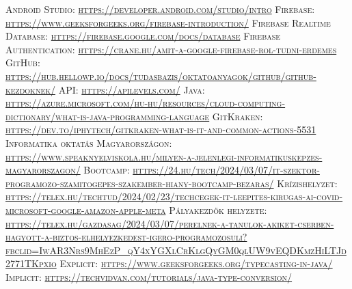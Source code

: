 \documentclass{thesis-ekf}
\begin{document}
	\begin{thebibliography}{14}
		\setlength{\itemindent}{0em}
		 \textsc{Android Studio: \url{https://developer.android.com/studio/intro}}
		 \textsc{Firebase: \url{https://www.geeksforgeeks.org/firebase-introduction/}}
		 \textsc{Firebase Realtime Database: \url{https://firebase.google.com/docs/database}}
		 \textsc{Firebase Authentication: \url{https://crane.hu/amit-a-google-firebase-rol-tudni-erdemes}}
		 \textsc{GitHub: \url{https://hub.hellowp.io/docs/tudasbazis/oktatoanyagok/github/github-kezdoknek/}}
		 \textsc{API: \url{https://apilevels.com/}}
		 \textsc{Java: \url{https://azure.microsoft.com/hu-hu/resources/cloud-computing-dictionary/what-is-java-programming-language}}
		 \textsc{GitKraken: \url{https://dev.to/iphytech/gitkraken-what-is-it-and-common-actions-5531}}
		 \textsc{Informatika oktatás Magyarországon: \url{https://www.speaknyelviskola.hu/milyen-a-jelenlegi-informatikuskepzes-magyarorszagon/}}
		 \textsc{Bootcamp: \url{https://24.hu/tech/2024/03/07/it-szektor-programozo-szamitogepes-szakember-hiany-bootcamp-bezaras/}}
		 \textsc{Krízishelyzet: \url{https://telex.hu/techtud/2024/02/23/techcegek-it-leepites-kirugas-ai-covid-microsoft-google-amazon-apple-meta}}
		 \textsc{Pályakezdők helyzete: \url{https://telex.hu/gazdasag/2024/03/07/perelnek-a-tanulok-akiket-cserben-hagyott-a-biztos-elhelyezkedest-igero-programozosuli?fbclid=IwAR3Nrs9MhEzP_qY4xYGXlCrKlgQyGM0qlUW9vEQDKmzHiLTJd2771TKpxio}}
		 \textsc{Explicit: \url{https://www.geeksforgeeks.org/typecasting-in-java/}}
		 \textsc{Implicit: \url{https://techvidvan.com/tutorials/java-type-conversion/}}
	\end{thebibliography}
\end{document}
